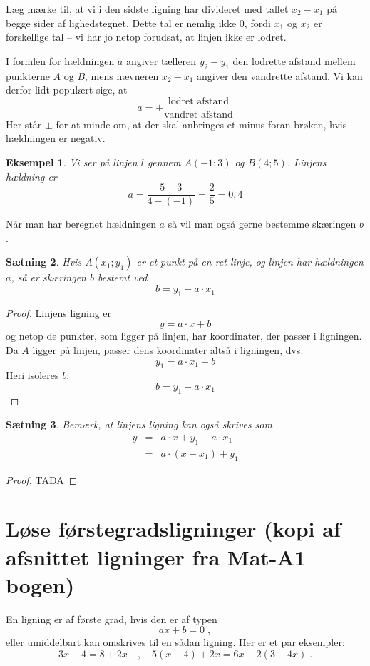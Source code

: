 \documentclass[12pt,oneside,a4paper]{article}
\newcommand{\bas}{\begin{eqnarray*}}
\newcommand{\eas}{\end{eqnarray*}}
\newtheorem{thm}{Sætning}[section]
\newtheorem{eks}[thm]{Eksempel}
\begin{document}
Læg mærke til, at vi i den sidste ligning har divideret med tallet $x_2-x_1$ på
begge sider af lighedstegnet. Dette tal er nemlig ikke $0$, fordi $x_1$ og
$x_2$ er forskellige tal -- vi har jo netop forudsat, at linjen ikke er lodret.

I formlen for hældningen $a$ angiver tælleren $y_2-y_1$ den lodrette afstand
mellem punkterne $A$ og $B$, mens nævneren $x_2-x_1$ angiver den vandrette
afstand. Vi kan derfor lidt populært sige, at
$$
a = \pm \frac{\mbox{lodret afstand}}{\mbox{vandret afstand}}
$$
Her står $\pm$ for at minde om, at der skal anbringes et minus foran brøken,
hvis hældningen er negativ.
\begin{eks}
    Vi ser på linjen $l$ gennem $A(-1; 3)$ og $B(4; 5)$.
    Linjens hældning er
    $$
    a = \frac{5-3}{4-(-1)} = \frac{2}{5} = 0,4
    $$
\end{eks}

Når man har beregnet hældningen $a$ så vil man også gerne bestemme skæringen
$b$.
\begin{thm}
    Hvis $A(x_1; y_1)$ er et punkt på en ret linje, og linjen har hældningen
    $a$, så er skæringen $b$ bestemt ved
    $$
    b = y_1 - a\cdot x_1
    $$
\end{thm}
\begin{proof}
    Linjens ligning er 
    $$
    y = a\cdot x + b
    $$
    og netop de punkter, som ligger på linjen, har koordinater, der passer i
    ligningen.  Da $A$ ligger på linjen, passer dens koordinater altså i
    ligningen, dvs.
    $$
    y_1 = a\cdot x_1 + b 
    $$
    Heri isoleres $b$:
    $$
    b = y_1 - a\cdot x_1
    $$
\end{proof}

\begin{thm}
Bemærk, at linjens ligning kan også skrives som
\bas
y &=& a\cdot x + y_1 - a\cdot x_1 \\
  &=& a\cdot (x-x_1) + y_1 
\eas
\end{thm}
\begin{proof}
    TADA
\end{proof}


\section{Løse førstegradsligninger (kopi af afsnittet ligninger fra Mat-A1 bogen)}
En ligning er af første grad, hvis den er af typen
$$
ax + b = 0\; ,
$$
eller umiddelbart kan omskrives til en sådan ligning. Her er et par eksempler:
$$
3x - 4 = 8 + 2x \quad , \quad 5(x - 4) + 2x = 6x - 2(3 - 4x)\; .
$$
\end{document}
